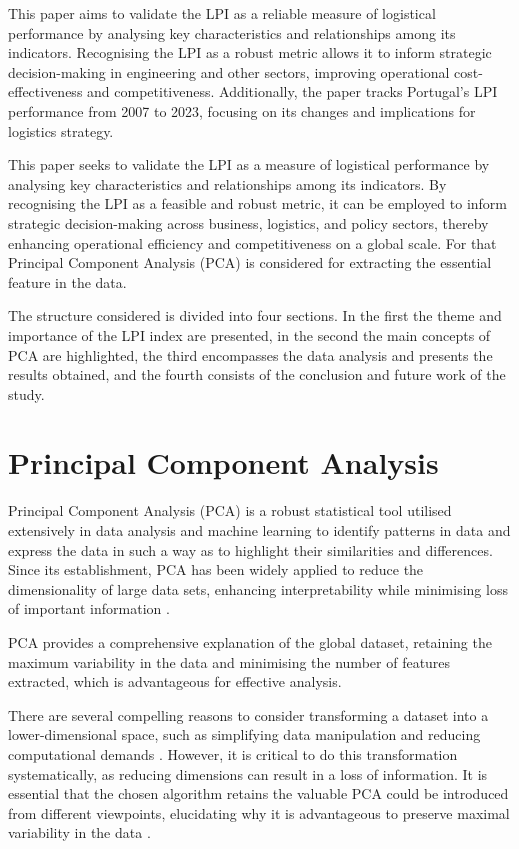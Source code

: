 \documentclass[conference]{IEEEtran}
\begin{document}
This paper aims to validate the LPI as a reliable measure of logistical performance by analysing key characteristics and relationships among its indicators. Recognising the LPI as a robust metric allows it to inform strategic decision-making in engineering and other sectors, improving operational cost-effectiveness and competitiveness. Additionally, the paper tracks Portugal’s LPI performance from 2007 to 2023, focusing on its changes and implications for logistics strategy.

This paper seeks to validate the LPI as a measure of logistical performance by analysing key characteristics and relationships among its indicators. By recognising the LPI as a feasible and robust metric, it can be employed to inform strategic decision-making across business, logistics, and policy sectors, thereby enhancing operational efficiency and competitiveness on a global scale.
For that Principal Component Analysis (PCA) is considered for extracting the essential feature in the data.

The structure considered is divided into four sections. In the first the theme and importance of the LPI index are presented, in the second the main concepts of PCA are highlighted, the third encompasses the data analysis and presents the results obtained, and the fourth consists of the conclusion and future work of the study.


\section{Principal Component Analysis}

Principal Component Analysis (PCA) is a robust statistical tool utilised extensively in data analysis and machine learning to identify patterns in data and express the data in such a way as to highlight their similarities and differences. Since its establishment, PCA has been widely applied to reduce the dimensionality of large data sets, enhancing interpretability while minimising loss of important information \cite{jolliffe2016principal, monahan2000nonlinear, takane2001constrained, maroco2018, watkins2018}.

PCA provides a comprehensive explanation of the global dataset, retaining the maximum variability in the data and minimising the number of features extracted, which is advantageous for effective analysis.

There are several compelling reasons to consider transforming a dataset into a lower-dimensional space, such as simplifying data manipulation and reducing computational demands \cite{wang2003feature, wu2007feature, correiaICIE}. However, it is critical to do this transformation systematically, as reducing dimensions can result in a loss of information. It is essential that the chosen algorithm retains the valuable PCA could be introduced from different viewpoints, elucidating why it is advantageous to preserve maximal variability in the data \cite{hasan2021review, ivosev2008dimensionality, bro2014principal}.
\end{document}
